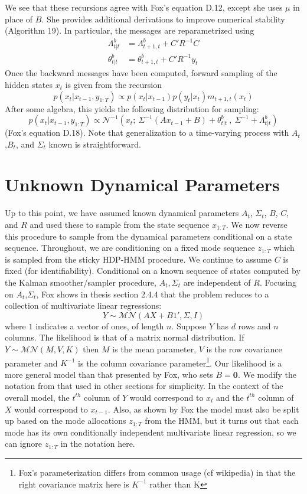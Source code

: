 \documentclass{article} %
\begin{document}
We see that these recursions agree with Fox's equation D.12, except she uses $\mu$ in place of $B$. She provides additional derivations to improve numerical stability (Algorithm 19). In particular, the messages are reparametrized using
\begin{align*}
\Lambda^b_{t|t} &= \Lambda^b_{t+1,t} + C'R^{-1}C\\
\theta^b_{t|t} &= \theta^b_{t+1,t} + C'R^{-1}y_t
\end{align*}
Once the backward messages have been computed, forward sampling of the hidden states $x_t$ is given from the recursion
\[p(x_t|x_{t-1},y_{1:T}) \propto p(x_t|x_{t-1})p(y_t|x_t)m_{t+1,t}(x_t)\]
After some algebra, this yields the following distribution for sampling:
\[p(x_t|x_{t-1},y_{1:T}) \propto \mathcal{N}^{-1}(x_t;~\Sigma^{-1}(Ax_{t-1}+B)+\theta^b_{t|t}~,~\Sigma^{-1}+\Lambda^b_{t|t})\]
(Fox's equation D.18). Note that generalization to a time-varying process with $A_t$,$B_t$, and $\Sigma_t$ known is straightforward.

\section{Unknown Dynamical Parameters} \label{sec:ap_matnorm}

Up to this point, we have assumed known dynamical parameters $A_t$, $\Sigma_t$, $B$, $C$, and $R$ and used these to sample from the state sequence $x_{1:T}$. We now reverse this procedure to sample from the dynamical parameters conditional on a state sequence. Throughout, we are conditioning on a fixed mode sequence $z_{1:T}$ which is sampled from the sticky HDP-HMM procedure. We continue to assume $C$ is fixed (for identifiability). Conditional on a known sequence of states computed by the Kalman smoother/sampler procedure, $A_t,\Sigma_t$ are independent of $R$. Focusing on $A_t$,$\Sigma_t$, Fox shows in thesis section 2.4.4 that the problem reduces to a collection of multivariate linear regressions:
\[Y\sim\mathcal{MN}(AX+B 1',\Sigma,I)\]
where $1$ indicates a vector of ones, of length $n$. Suppose $Y$ has $d$ rows and $n$ columns. The likelihood is that of a matrix normal distribution. If $Y\sim\mathcal{MN}(M,V,K)$ then $M$ is the mean parameter, $V$ is the row covariance parameter and $K^{-1}$ is the column covariance parameter\footnote{Fox's parameterization differs from common usage (cf wikipedia) in that the right covariance matrix here is $K^{-1}$ rather than K}. Our likelihood is a more general model than that presented by Fox, who sets $B=\mathbf{0}$. We modify the notation from that used in other sections for simplicity. In the context of the overall model, the $t^{th}$ column of $Y$ would correspond to $x_{t}$ and the $t^{th}$ column of $X$ would correspond to $x_{t-1}$. Also, as shown by Fox the model must also be split up based on the mode allocations $z_{1:T}$ from the HMM, but it turns out that each mode has its own conditionally independent multivariate linear regression, so we can ignore $z_{1:T}$ in the notation here.
\end{document}

